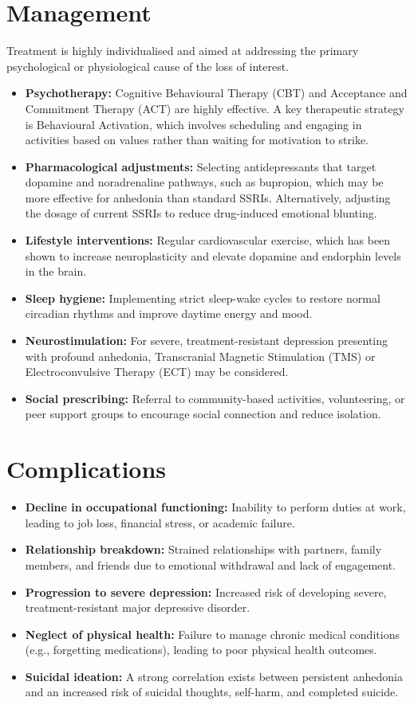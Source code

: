 \section*{Management}
Treatment is highly individualised and aimed at addressing the primary psychological or physiological cause of the loss of interest.
\begin{itemize}
    \item \textbf{Psychotherapy:} Cognitive Behavioural Therapy (CBT) and Acceptance and Commitment Therapy (ACT) are highly effective. A key therapeutic strategy is Behavioural Activation, which involves scheduling and engaging in activities based on values rather than waiting for motivation to strike.
    \item \textbf{Pharmacological adjustments:} Selecting antidepressants that target dopamine and noradrenaline pathways, such as bupropion, which may be more effective for anhedonia than standard SSRIs. Alternatively, adjusting the dosage of current SSRIs to reduce drug-induced emotional blunting.
    \item \textbf{Lifestyle interventions:} Regular cardiovascular exercise, which has been shown to increase neuroplasticity and elevate dopamine and endorphin levels in the brain.
    \item \textbf{Sleep hygiene:} Implementing strict sleep-wake cycles to restore normal circadian rhythms and improve daytime energy and mood.
    \item \textbf{Neurostimulation:} For severe, treatment-resistant depression presenting with profound anhedonia, Transcranial Magnetic Stimulation (TMS) or Electroconvulsive Therapy (ECT) may be considered.
    \item \textbf{Social prescribing:} Referral to community-based activities, volunteering, or peer support groups to encourage social connection and reduce isolation.
\end{itemize}

\section*{Complications}
\begin{itemize}
    \item \textbf{Decline in occupational functioning:} Inability to perform duties at work, leading to job loss, financial stress, or academic failure.
    \item \textbf{Relationship breakdown:} Strained relationships with partners, family members, and friends due to emotional withdrawal and lack of engagement.
    \item \textbf{Progression to severe depression:} Increased risk of developing severe, treatment-resistant major depressive disorder.
    \item \textbf{Neglect of physical health:} Failure to manage chronic medical conditions (e.g., forgetting medications), leading to poor physical health outcomes.
    \item \textbf{Suicidal ideation:} A strong correlation exists between persistent anhedonia and an increased risk of suicidal thoughts, self-harm, and completed suicide.
\end{itemize}


